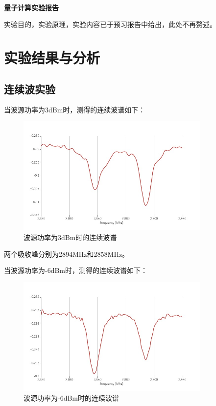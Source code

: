 \documentclass[a4paper,UTF8]{ctexart}
\begin{document}
\begin{center}
    \textbf{\Large 量子计算实验报告}
    \par {}
\end{center}

实验目的，实验原理，实验内容已于预习报告中给出，此处不再赘述。

\section{实验结果与分析}

\subsection{连续波实验}

当波源功率为3dBm时，测得的连续波谱如下：

\begin{figure}[H]
    \centering
    \begin{minipage}[b]{0.9\textwidth}
        \centering
        \includegraphics[width=0.85\textwidth]{./1.jpeg}
        \caption{波源功率为3dBm时的连续波谱}
    \end{minipage}
\end{figure}

两个吸收峰分别为2894MHz和2858MHz。

当波源功率为-6dBm时，测得的连续波谱如下：

\begin{figure}[H]
    \centering
    \begin{minipage}[b]{0.9\textwidth}
        \centering
        \includegraphics[width=0.85\textwidth]{./2.jpeg}
        \caption{波源功率为-6dBm时的连续波谱}
    \end{minipage}
\end{figure}
\end{document}
